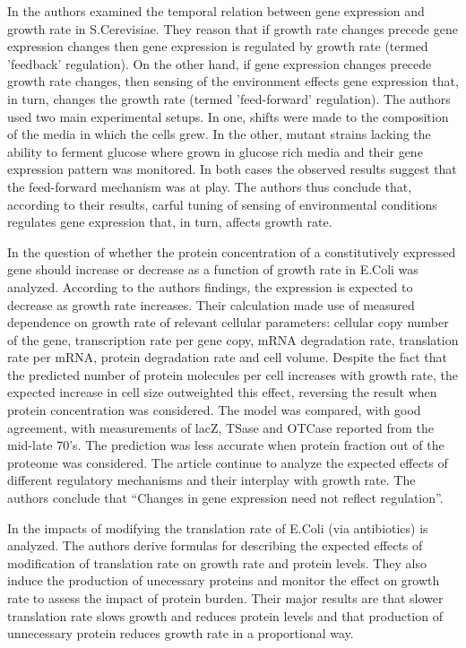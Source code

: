 \documentclass{report}
\begin{document}
In \cite{Levy2009} the authors examined the temporal relation between gene expression and growth rate in S.Cerevisiae.
They reason that if growth rate changes precede gene expression changes then gene expression is regulated by growth rate (termed 'feedback' regulation).
On the other hand, if gene expression changes precede growth rate changes, then sensing of the environment effects gene expression that, in turn, changes the growth rate (termed 'feed-forward' regulation).
The authors used two main experimental setups.
In one, shifts were made to the composition of the media in which the cells grew.
In the other, mutant strains lacking the ability to ferment glucose where grown in glucose rich media and their gene expression pattern was monitored.
In both cases the observed results suggest that the feed-forward mechanism was at play.
The authors thus conclude that, according to their results, carful tuning of sensing of environmental conditions regulates gene expression that, in turn, affects growth rate.

In \cite{Klumpp2009a} the question of whether the protein concentration of a constitutively expressed gene should increase or decrease as a function of growth rate in E.Coli was analyzed.
According to the authors findings, the expression is expected to decrease as growth rate increases.
Their calculation made use of measured dependence on growth rate of relevant cellular parameters: cellular copy number of the gene, transcription rate per gene copy, mRNA degradation rate, translation rate per mRNA, protein degradation rate and cell volume.
Despite the fact that the predicted number of protein molecules per cell increases with growth rate, the expected increase in cell size outweighted this effect, reversing the result when protein concentration was considered.
The model was compared, with good agreement, with measurements of lacZ, TSase and OTCase reported from the mid-late 70's.
The prediction was less accurate when protein fraction out of the proteome was considered.
The article continue to analyze the expected effects of different regulatory mechanisms and their interplay with growth rate.
The authors conclude that ``Changes in gene expression need not reflect regulation''.

In \cite{Scott2010a} the impacts of modifying the translation rate of E.Coli (via antibiotics) is analyzed.
The authors derive formulas for describing the expected effects of modification of translation rate on growth rate and protein levels.
They also induce the production of unecessary proteins and monitor the effect on growth rate to assess the impact of protein burden.
Their major results are that slower translation rate slows growth and reduces protein levels and that production of unnecessary protein reduces growth rate in a proportional way.
\end{document}

